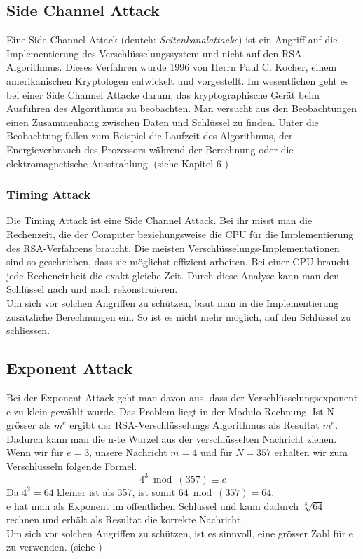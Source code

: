 %
\subsection{Side Channel Attack}
Eine Side Channel Attack (deutch: \textit{Seitenkanalattacke}) ist ein Angriff auf die Implementierung des Verschlüsselungssystem und nicht auf den RSA-Algorithmus. Dieses Verfahren wurde 1996 von Herrn Paul C. Kocher, einem amerikanischen Kryptologen entwickelt und vorgestellt.
Im wesentlichen geht es bei einer Side Channel Attacke darum, das kryptographische Gerät beim Ausführen des Algorithmus zu beobachten.
Man versucht aus den Beobachtungen einen Zusammenhang zwischen Daten und Schlüssel zu finden.
Unter die Beobachtung fallen zum Beispiel die Laufzeit des Algorithmus, der Energieverbrauch des Prozessors während der Berechnung oder die elektromagnetische Ausstrahlung. (siehe Kapitel 6 \cite{rsa_and_public_key})
%
\subsubsection{Timing Attack}
Die Timing Attack ist eine Side Channel Attack. 
Bei ihr misst man die Rechenzeit, die der Computer beziehungsweise die CPU für die Implementierung des RSA-Verfahrens braucht. Die meisten Verschlüsselungs-Implementationen sind so geschrieben, dass sie möglichst effizient arbeiten. Bei einer CPU braucht jede Recheneinheit die exakt gleiche Zeit. Durch diese Analyse kann man den Schlüssel nach und nach rekonstruieren.\\
%
Um sich vor solchen Angriffen zu schützen, baut man in die Implementierung zusätzliche Berechnungen ein. So ist es nicht mehr möglich, auf den Schlüssel zu schliessen.
%
%
\subsection{Exponent Attack}
Bei der Exponent Attack geht man davon aus, dass der Verschlüsselungsexponent e zu klein gewählt wurde. Das Problem liegt in der Modulo-Rechnung. Ist N grösser als $m^e$ ergibt der RSA-Verschlüsselungs Algorithmus als Resultat $m^e$. Dadurch kann man die n-te Wurzel aus der verschlüsselten Nachricht ziehen. \\
Wenn wir für $e = 3$, unsere Nachricht $m = 4$ und für $N = 357$ erhalten wir zum Verschlüsseln folgende Formel.
\begin{equation*}
  4^3 \bmod(357) \equiv c
\end{equation*}
Da $4^3 = 64$ kleiner ist als 357, ist somit $64 \bmod(357) = 64$.\\
e hat man als Exponent im öffentlichen Schlüssel und kann dadurch $\sqrt[3]{64}$ rechnen und erhält als Resultat die korrekte Nachricht.\\
%
Um sich vor solchen Angriffen zu schützen, ist es sinnvoll, eine grösser Zahl für e zu verwenden. (siehe \cite{exponent_Attack} )
